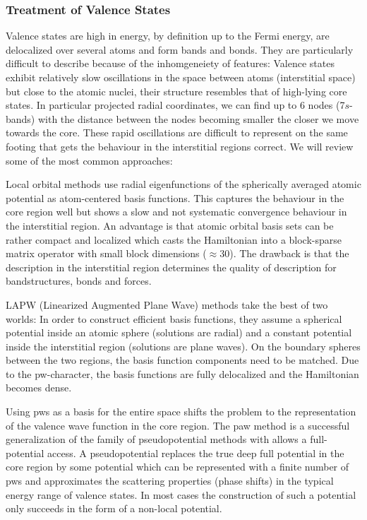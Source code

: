 \documentclass[oribibl]{llncs}
\begin{document}
\subsubsection{Treatment of Valence States}
Valence states are high in energy, by definition up to the Fermi
energy, are delocalized over several atoms and form bands and bonds.
They are particularly difficult to describe because of the 
inhomgeneiety of features:
Valence states exhibit relatively slow oscillations 
in the space between atoms (interstitial space) but close to the atomic nuclei,
their structure resembles that of high-lying core states.
In particular projected radial coordinates, we can find up to $6$ nodes
(7$s$-bands) with the distance between the nodes becoming smaller
the closer we move towards the core.
These rapid oscillations are difficult to represent
on the same footing that gets the behaviour in the interstitial regions correct. 
We will review some of the most common approaches:

Local orbital methods use radial eigenfunctions 
of the spherically averaged atomic potential as atom-centered basis functions.
This captures the behaviour in the core region well
but shows a slow and not systematic convergence behaviour in the interstitial region. 
An advantage is that atomic orbital basis sets can be rather compact
and localized which casts the Hamiltonian into a block-sparse matrix operator with small block dimensions ($\approx 30$).
The drawback is that the description in the interstitial region determines the
quality of description for bandstructures, bonds and forces.

LAPW (Linearized Augmented Plane Wave) methods take the best of two worlds:
In order to construct efficient basis functions, 
they assume a spherical potential inside an atomic sphere (solutions are radial)
and a constant potential inside the interstitial region (solutions are plane waves). 
On the boundary spheres between the two regions, the basis function components need to be matched.
Due to the \ac{pw}-character, the basis functions are fully delocalized and 
the Hamiltonian becomes dense.

Using \ac{pw}s as a basis for the entire space shifts the problem to the representation of the valence wave function in the core region.
The \ac{paw} method is a successful generalization of the family of pseudopotential methods with allows a full-potential access.
A pseudopotential replaces the true deep full potential in the core region
by some potential which can be represented with a finite number of \ac{pw}s
and approximates the scattering properties (phase shifts) in the typical energy
range of valence states.
In most cases the construction of such a potential only succeeds in the form of
a non-local potential.
\end{document}
